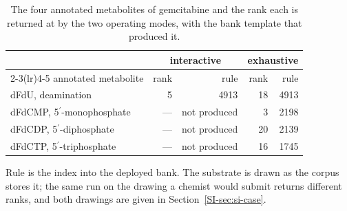 \begin{table}[t]
\centering\small
\begin{threeparttable}
\caption{The four annotated metabolites of gemcitabine and the rank each is returned at by the two operating modes, with the bank template that produced it.}
\label{tab:case}
\begin{tabular}{lrrrr}
\toprule
 & \multicolumn{2}{c}{interactive} & \multicolumn{2}{c}{exhaustive} \\
\cmidrule(lr){2-3}\cmidrule(lr){4-5}
annotated metabolite & rank & rule & rank & rule \\
\midrule
dFdU, deamination & 5 & 4913 & 18 & 4913 \\
dFdCMP, 5$^\prime$-monophosphate & --- & not produced & 3 & 2198 \\
dFdCDP, 5$^\prime$-diphosphate & --- & not produced & 20 & 2139 \\
dFdCTP, 5$^\prime$-triphosphate & --- & not produced & 16 & 1745 \\
\bottomrule
\end{tabular}
\begin{tablenotes}[flushleft]\footnotesize
\item Rule is the index into the deployed bank. The substrate is drawn as the corpus stores it; the same run on the drawing a chemist would submit returns different ranks, and both drawings are given in Section~\ref{SI-sec:si-case}.
\end{tablenotes}
\end{threeparttable}
\end{table}

